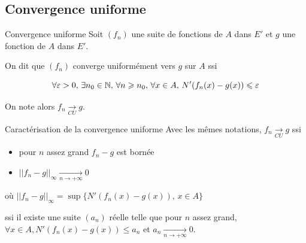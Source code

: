\subsection{Convergence uniforme}

\begin{definition}{Convergence uniforme}{}
    Soit $(f_n)$ une suite de fonctions de $A$ dans $E'$ et $g$ une fonction de $A$ dans $E'$.

    On dit que $(f_n)$ converge uniformément vers $g$ sur $A$ ssi 
    
    $$\forall \varepsilon >0, \, \exists n_0 \in \mathbb{N}, \, \forall n \geqslant n_0, \, \forall x \in A, \, N'(f_n(x) - g(x) ) \leqslant \varepsilon$$

    On note alors $f_n \xrightarrow[CU]{} g$.
\end{definition}

\begin{proposition}{Caractérisation de la convergence uniforme}{}
    Avec les mêmes notations, $f_n \xrightarrow[CU]{} g$ ssi 
    
    \begin{itemize}
        \item pour $n$ assez grand $f_n - g$ est bornée 
        \item $\displaystyle || f_n - g ||_{\infty} \xrightarrow[n\to +\infty]{} 0$
    \end{itemize}

    où $\displaystyle || f_n - g ||_{\infty} = \sup\{ N'(f_n(x) - g(x)), \, x \in A \}$
    
    ssi il existe une suite $(a_n)$ réelle telle que pour $n$ assez grand, 
    $\forall x \in A, N'(f_n(x) - g(x)) \leqslant a_n$ et $a_n \xrightarrow[n\to +\infty]{} 0$.
     
\end{proposition}


